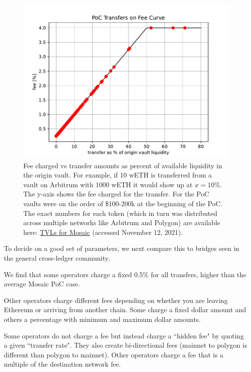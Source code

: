 \begin{figure}
    \centering
    \includegraphics[scale=0.8]{images/mosaic/poc_transfer_on_fee_curve.pdf}
    \caption{Fee charged vs transfer amounts as percent of available liquidity in the origin vault. For example, if 10 wETH is transferred from a vault on Arbitrum with 1000 wETH it would show up at $x=10$\%. The y-axis shows the fee charged for the transfer. For the PoC vaults were on the order of \$100-200k at the beginning of the PoC. The exact numbers for each token (which in turn was distributed across multiple networks like Arbitrum and Polygon) are available here: \href{https://mosaic.composable.finance/earn}{TVLs for Mosaic} (accessed November 12, 2021).}
    \label{fig:pocdatafees}
\end{figure}
%
To decide on a good set of parameters, we next compare this to bridges seen in the general cross-ledger community.

We find that some operators charge a fixed 0.5\% for all transfers, higher than the average Mosaic PoC case.

Other operators charge different fees depending on whether you are leaving Ethereum or arriving from another chain. Some charge a fixed dollar amount and others a percentage with minimum and maximum dollar amounts.

Some operators do not charge a fee but instead charge a ``hidden fee" by quoting a given ``transfer rate". They also create bi-directional fees (mainnet to polygon is different than polygon to mainnet).
%
Other operators charge a fee that is a multiple of the destination network fee.

